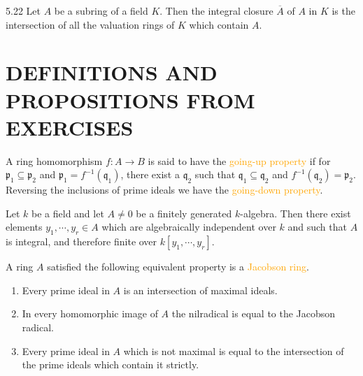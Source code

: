 \begin{corollary}{5.22}
	Let $A$ be a subring of a field $K$. Then the integral closure $\overline{A}$ of $A$ in $K$ is the intersection of all the valuation rings of $K$ which contain $A$.
\end{corollary}

\section*{DEFINITIONS AND PROPOSITIONS FROM EXERCISES}

\begin{definition}
	A ring homomorphism $f: A\rightarrow B$ is said to have the \textcolor{orange}{going-up property} if for $\mathfrak{p}_1\subseteq\mathfrak{p}_2$ and $\mathfrak{p}_1=f^{-1}(\mathfrak{q}_1)$, there exist a $\mathfrak{q}_2$ such that $\mathfrak{q}_1\subseteq\mathfrak{q}_2$ and $f^{-1}(\mathfrak{q}_2)=\mathfrak{p}_2$. Reversing the inclusions of prime ideals we have the \textcolor{orange}{going-down property}.
\end{definition}

\begin{proposition*}[\textcolor{red}{Noether normalization lemma}]\label{noethernormalization}
	Let $k$ be a field and let $A\neq0$ be a finitely generated $k$-algebra. Then there exist elements $y_1,\cdots,y_r\in A$ which are algebraically independent over $k$ and such that $A$ is integral, and therefore finite over $k[y_1,\cdots,y_r]$.
\end{proposition*}

\begin{definition}
	A ring $A$ satisfied the following equivalent property is a \textcolor{orange}{Jacobson ring}.
	\begin{enumerate}[label=\textup{(\roman*)}]
		\item Every prime ideal in $A$ is an intersection of maximal ideals.
		\item In every homomorphic image of $A$ the nilradical is equal to the Jacobson radical.
		\item Every prime ideal in $A$ which is not maximal is equal to the intersection of the prime ideals which contain it strictly.
	\end{enumerate}
\end{definition}


